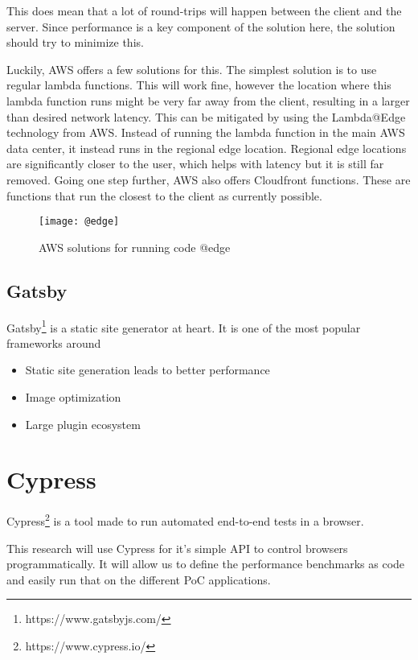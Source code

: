This does mean that a lot of round-trips will happen between the client and the server. 
Since performance is a key component of the solution here, the solution should try to minimize this.

Luckily, AWS offers a few solutions for this. 
The simplest solution is to use regular lambda functions. 
This will work fine, however the location where this lambda function runs might be very far away from the client, resulting in a larger than desired network latency.
This can be mitigated by using the Lambda@Edge technology from AWS. Instead of running the lambda function in the main AWS data center, it instead runs in the regional edge location.
Regional edge locations are significantly closer to the user, which helps with latency but it is still far removed.
Going one step further, AWS also offers Cloudfront functions. These are functions that run the closest to the client as currently possible.

\begin{figure}[htb!]
	\texttt{[image: @edge]}{}
	\caption{AWS solutions for running code @edge \cite*{aws@edge}}
	\label{fig:@edge}
\end{figure}


\subsection{Gatsby}

Gatsby\footnote{https://www.gatsbyjs.com/} is a static site generator at heart. It is one of the most popular frameworks around \cite{jamstackorg-generators}

\begin{itemize}
	\item Static site generation leads to better performance
	\item Image optimization
	\item Large plugin ecosystem
\end{itemize}



\section{Cypress}

Cypress\footnote{https://www.cypress.io/} is a tool made to run automated end-to-end tests in a browser. 

This research will use Cypress for it's simple API to control browsers programmatically. It will allow us to define the performance benchmarks as code and easily run that on the different PoC applications.

